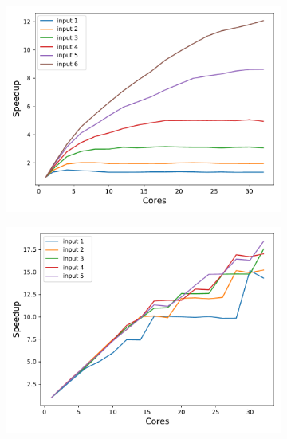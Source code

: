\begin{figure}[H]
	\begin{subfigure}[b]{0.45\textwidth}
		\includegraphics[width=\textwidth]{pascalanalyzer/figures/results/speedup_completo_rtview_2 (1).pdf}
		\caption{\centering}
		\label{fig:speedup_raytrace}
	\end{subfigure}
	\begin{subfigure}[b]{0.45\textwidth}
		\includegraphics[width=\textwidth]{pascalanalyzer/figures/results/speedup_completo_openmc_kernel_novo (1).pdf}
		\caption{\centering}
		\label{fig:speedup_openmc}
	\end{subfigure}
	\caption{}
	\label{fig:speedup}
\end{figure}
